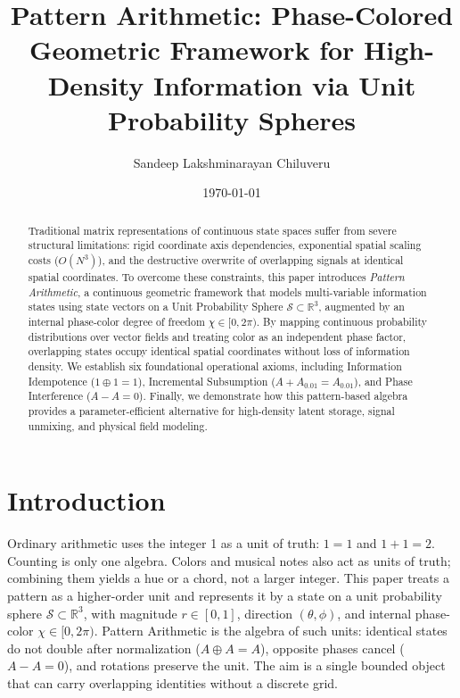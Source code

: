 \documentclass[12pt, a4paper]{article}
\title{Pattern Arithmetic: Phase-Colored Geometric Framework for High-Density Information via Unit Probability Spheres}
\author{Sandeep Lakshminarayan Chiluveru}
\date{\today}
\begin{document}
\maketitle

\begin{abstract}
Traditional matrix representations of continuous state spaces suffer from severe structural limitations: rigid coordinate axis dependencies, exponential spatial scaling costs ($O(N^3)$), and the destructive overwrite of overlapping signals at identical spatial coordinates. To overcome these constraints, this paper introduces \textit{Pattern Arithmetic}, a continuous geometric framework that models multi-variable information states using state vectors on a Unit Probability Sphere $\mathcal{S} \subset \mathbb{R}^3$, augmented by an internal phase-color degree of freedom $\chi \in [0, 2\pi)$. By mapping continuous probability distributions over vector fields and treating color as an independent phase factor, overlapping states occupy identical spatial coordinates without loss of information density. We establish six foundational operational axioms, including Information Idempotence ($1 \oplus 1 = 1$), Incremental Subsumption ($A + A_{0.01} = A_{0.01}$), and Phase Interference ($A - A = 0$). Finally, we demonstrate how this pattern-based algebra provides a parameter-efficient alternative for high-density latent storage, signal unmixing, and physical field modeling.
\end{abstract}

\section{Introduction}

Ordinary arithmetic uses the integer 1 as a unit of truth: $1=1$ and $1+1=2$. Counting is only one algebra. Colors and musical notes also act as units of truth; combining them yields a hue or a chord, not a larger integer. This paper treats a pattern as a higher-order unit and represents it by a state on a unit probability sphere $\mathcal{S} \subset \mathbb{R}^3$, with magnitude $r \in [0,1]$, direction $(\theta, \phi)$, and internal phase-color $\chi \in [0, 2\pi)$. Pattern Arithmetic is the algebra of such units: identical states do not double after normalization ($A \oplus A = A$), opposite phases cancel ($A - A = 0$), and rotations preserve the unit. The aim is a single bounded object that can carry overlapping identities without a discrete grid.
\end{document}
